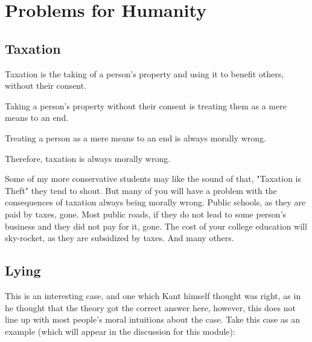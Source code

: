 \section{Problems for Humanity}
\subsection{Taxation}
\begin{earg}
    \item[] Taxation is the taking of a person’s property and using it to benefit others, without their consent.
    \item[] Taking a person’s property without their consent is treating them as a mere means to an end.
    \item[] Treating a person as a mere means to an end is always morally wrong.
    \item[] Therefore, taxation is always morally wrong.
\end{earg}
Some of my more conservative students may like the sound of that, "Taxation is Theft" they tend to shout. But many of you will have a problem with the consequences of taxation always being morally wrong. Public schools, as they are paid by taxes, gone. Most public roads, if they do not lead to some person's business and they did not pay for it, gone. The cost of your college education will sky-rocket, as they are subsidized by taxes. And many others.
\subsection{Lying}

This is an interesting case, and one which Kant himself thought was right, as in he thought that the theory got the correct answer here, however, this does not line up with most people's moral intuitions about the case. Take this case as an example (which will appear in the discussion for this module):


